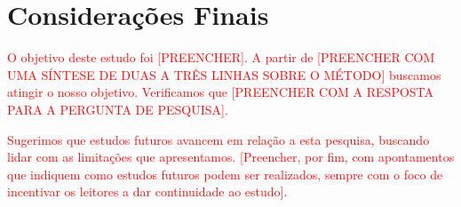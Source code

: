 \section{Considerações Finais}
\label{sec:conclusao}



\textcolor{red}{O objetivo deste estudo foi [PREENCHER]. A partir de [PREENCHER COM UMA SÍNTESE DE DUAS A TRÊS LINHAS SOBRE O MÉTODO] buscamos atingir o nosso objetivo. Verificamos que [PREENCHER COM A RESPOSTA PARA A PERGUNTA DE PESQUISA].}

\textcolor{red}{Sugerimos que estudos futuros avancem em relação a esta pesquisa, buscando lidar com as limitações que apresentamos. [Preencher, por fim, com apontamentos que indiquem como estudos futuros podem ser realizados, sempre com o foco de incentivar os leitores a dar continuidade ao estudo].}